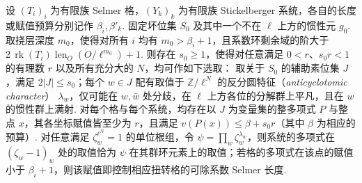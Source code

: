 \begin{lemma}[辅助位多项式的共同构造]
\label{lem:c-selmer-twist-polynomials}
\emitthmsource
设 $(T_i)_i$ 为有限族 Selmer 格，$(Y_k)_k$ 为有限族 Stickelberger 系统，各自的长度或赋值预算分别记作 $\beta_i,\beta'_k$.
固定坏位集 $S_0$ 及其中一个不在 $\ell$ 上方的惯性元 $g_0$.
取挠层深度 $m_0$，使得对所有 $i$ 均有 $m_0>\beta_i+1$，且系数环剩余域的阶大于 $2\,\operatorname{rk}(T_i)\operatorname{len}_O(O/\ell^{m_0})+1$.
则存在 $s_0\ge1$，使得对任意满足 $0<r$、$s_0r<1$ 的有理数 $r$ 以及所有充分大的 $N$，均可作如下选取：
取关于 $S_0$ 的辅助素位集 $J$，满足 $2|J|\le s_0$；每个 $w\in J$ 配有取值于 $\mathbb Z/\ell^N$ 的反分圆特征（\emph{anticyclotomic character}） $\lambda_w$，仅可能在 $w,\bar w$ 处分歧，在 $\ell$ 上方各位的分解群上平凡，且在 $w$ 的惯性群上满射.
对每个格与每个系统，均存在以 $J$ 为变量集的整多项式 $P$ 与整点 $x$，其各坐标赋值皆至少为 $r$，且满足 $v(P(x))\le\beta+s_0r$（其中 $\beta$ 为相应的预算）.
对任意满足 $\zeta_w^{\ell^N}=1$ 的单位根组，令 $\psi=\prod_w\zeta_w^{\lambda_w}$，则系统的多项式在 $(\zeta_w-1)_w$ 处的取值恰为 $\psi$ 在其群环元素上的取值；若格的多项式在该点的赋值小于 $\beta_i+1$，则该赋值即控制相应扭转格的可除系数 Selmer 长度.
\end{lemma}
